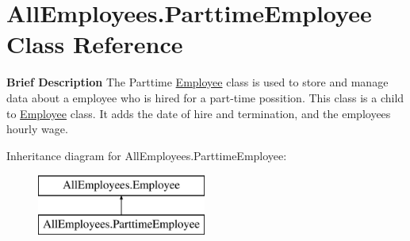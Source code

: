 \hypertarget{class_all_employees_1_1_parttime_employee}{}\section{All\+Employees.\+Parttime\+Employee Class Reference}
\label{class_all_employees_1_1_parttime_employee}


{\bfseries Brief Description} The Parttime \hyperlink{class_all_employees_1_1_employee}{Employee} class is used to store and manage data about a employee who is hired for a part-\/time possition. This class is a child to \hyperlink{class_all_employees_1_1_employee}{Employee} class. It adds the date of hire and termination, and the employees hourly wage.  


Inheritance diagram for All\+Employees.\+Parttime\+Employee\+:\begin{figure}[H]
\begin{center}
\leavevmode
\includegraphics[height=2.000000cm]{class_all_employees_1_1_parttime_employee}
\end{center}
\end{figure}
